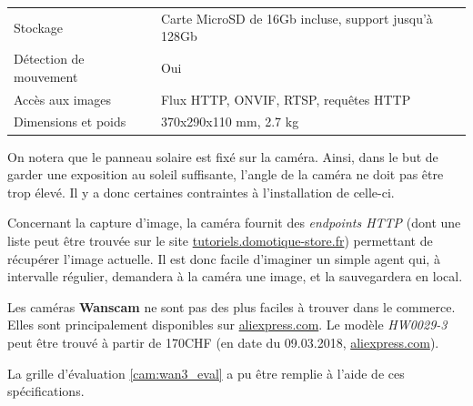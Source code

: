 \begin{table}[H]
\begin{tabular}{@{}ll@{}}
    Stockage               & Carte MicroSD de 16Gb incluse, support jusqu'à 128Gb                                                                                                                                                                                                                                        \\ [0.8ex]
    Détection de mouvement & Oui                                                                                                                                                                                                                                                                                         \\ [0.8ex]
    Accès aux images       & Flux HTTP, ONVIF, RTSP, requêtes HTTP                                                                                                                                                                                                                                                       \\ [0.8ex]
    Dimensions et poids    & 370x290x110 mm, 2.7 kg                                                                                                                                                                                                                                                                      \\ \bottomrule
    \end{tabular}
\end{table}

On notera que le panneau solaire est fixé sur la caméra. Ainsi, dans le but de garder une exposition au soleil suffisante, l'angle de la caméra ne doit pas être trop élevé. Il y a donc certaines contraintes à l'installation de celle-ci.

Concernant la capture d'image, la caméra fournit des \textit{endpoints HTTP} (dont une liste peut être trouvée sur le site \url{tutoriels.domotique-store.fr}\autocite{cam:wan3-url}) permettant de récupérer l'image actuelle. Il est donc facile d'imaginer un simple agent qui, à intervalle régulier, demandera à la caméra une image, et la sauvegardera en local.

Les caméras \textbf{Wanscam} ne sont pas des plus faciles à trouver dans le commerce. Elles sont principalement disponibles sur \url{aliexpress.com}. Le modèle \textit{HW0029-3} peut être trouvé à partir de 170CHF (en date du 09.03.2018, \url{aliexpress.com}).

La grille d'évaluation \ref{cam:wan3_eval} a pu être remplie à l'aide de ces spécifications.

